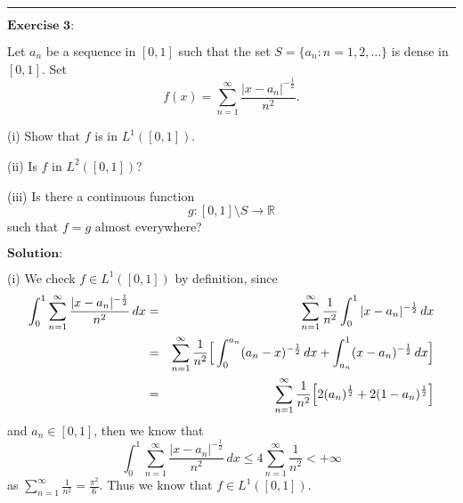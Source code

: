\documentclass[12pt,a4paper]{ctexart}
\begin{document}
\noindent\rule[0.25\baselineskip]{\textwidth}{0.5pt}

\vspace{8pt}

$\textbf{Exercise 3:}$

Let $a_{n}$ be a sequence in $[0, 1]$ such that the set $S = \{a_{n}: n = 1, 2, \dots \}$ is dense in $[0, 1]$. Set
\begin{equation*}
   f(x) = \sum_{n = 1}^{\infty} \frac{|x - a_{n}|^{- \frac{1}{2}}}{n^{2}}.
\end{equation*}

(i) Show that $f$ is in $L^{1}([0, 1])$.

(ii) Is $f$ in $L^{2} ([0, 1])$?

(iii) Is there a continuous function
\begin{equation*}
   g : [0, 1] \setminus S \rightarrow \mathbb{R}
\end{equation*}
such that $f = g$ almost everywhere?

\vspace{8pt}
$\textbf{Solution:}$

(i) We check $f \in L^{1}([0,1])$ by definition, since
\begin{eqnarray*}
\int_{0}^{1} \sum_{n = 1}^{\infty} \frac{|x - a_{n}|^{- \frac{1}{2}}}{n^{2}} \, d x  & = & \sum_{n = 1}^{\infty} \frac{1}{n^{2}} \int_{0}^{1} |x - a_{n}|^{- \frac{1}{2}} \, d x \\
& = & \sum_{n = 1}^{\infty} \frac{1}{n^{2}} \Big{[}  \int_{0}^{a_{n}} (a_{n} - x)^{- \frac{1}{2}} \, d x + \int_{a_{n}}^{1} (x - a_{n})^{- \frac{1}{2}} \, d x  \Big{]} \\
& = & \sum_{n = 1}^{\infty} \frac{1}{n^{2}} \Big{[} 2 (a_{n})^{\frac{1}{2}} + 2 (1 - a_{n})^{\frac{1}{2}}  \Big{]}
\end{eqnarray*}
and $a_{n} \in [0, 1]$, then we know that
\begin{equation*}
   \int_{0}^{1} \sum_{n = 1}^{\infty} \frac{|x - a_{n}|^{- \frac{1}{2}}}{n^{2}} \, d x \leq 4 \sum_{n = 1}^{\infty} \frac{1}{n^{2}} < + \infty
\end{equation*}
as $\sum_{n = 1}^{\infty} \frac{1}{n^{2}} = \frac{\pi^{2}}{6}$. Thus we know that $f \in L^{1}([0,1])$.
\end{document}
